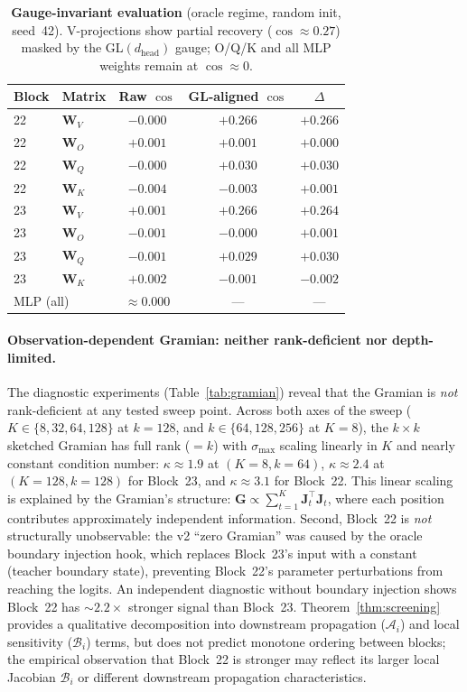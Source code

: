 \documentclass{article}
\newcommand{\bW}{\mathbf{W}}
\newcommand{\bJ}{\mathbf{J}}
\newcommand{\bG}{\mathbf{G}}
\newcommand{\cA}{\mathcal{A}}
\newcommand{\cB}{\mathcal{B}}
\begin{document}
\begin{table}[t]
\centering
\caption{\textbf{Gauge-invariant evaluation} (oracle regime, random init, seed~42).  V-projections show partial recovery ($\cos \approx 0.27$) masked by the GL$(d_\text{head})$ gauge; O/Q/K and all MLP weights remain at $\cos \approx 0$.}
\label{tab:gauge-invariant}
\small
\begin{tabular}{@{}l l cc c@{}}
\toprule
\textbf{Block} & \textbf{Matrix} & \textbf{Raw $\cos$} & \textbf{GL-aligned $\cos$} & \textbf{$\Delta$} \\
\midrule
22 & $\bW_V$ & $-0.000$ & $+0.266$ & $+0.266$ \\
22 & $\bW_O$ & $+0.001$ & $+0.001$ & $+0.000$ \\
22 & $\bW_Q$ & $-0.000$ & $+0.030$ & $+0.030$ \\
22 & $\bW_K$ & $-0.004$ & $-0.003$ & $+0.001$ \\
\midrule
23 & $\bW_V$ & $+0.001$ & $+0.266$ & $+0.264$ \\
23 & $\bW_O$ & $-0.001$ & $-0.000$ & $+0.001$ \\
23 & $\bW_Q$ & $-0.001$ & $+0.029$ & $+0.030$ \\
23 & $\bW_K$ & $+0.002$ & $-0.001$ & $-0.002$ \\
\midrule
\multicolumn{2}{l}{MLP (all)} & $\approx 0.000$ & --- & --- \\
\bottomrule
\end{tabular}
\end{table}

\paragraph{Observation-dependent Gramian: neither rank-deficient nor depth-limited.}
The diagnostic experiments (Table~\ref{tab:gramian}) reveal that the Gramian is \emph{not} rank-deficient at any tested sweep point.  Across both axes of the sweep ($K \in \{8, 32, 64, 128\}$ at $k{=}128$, and $k \in \{64, 128, 256\}$ at $K{=}8$), the $k \times k$ sketched Gramian has full rank ($= k$) with $\sigma_{\max}$ scaling linearly in $K$ and nearly constant condition number: $\kappa \approx 1.9$ at $(K{=}8, k{=}64)$, $\kappa \approx 2.4$ at $(K{=}128, k{=}128)$ for Block~23, and $\kappa \approx 3.1$ for Block~22.  This linear scaling is explained by the Gramian's structure: $\bG \propto \sum_{t=1}^{K} \bJ_t^\top \bJ_t$, where each position contributes approximately independent information.  Second, Block~22 is \emph{not} structurally unobservable: the v2 ``zero Gramian'' was caused by the oracle boundary injection hook, which replaces Block~23's input with a constant (teacher boundary state), preventing Block~22's parameter perturbations from reaching the logits.  An independent diagnostic without boundary injection shows Block~22 has $\sim 2.2\times$ stronger signal than Block~23.  Theorem~\ref{thm:screening} provides a qualitative decomposition into downstream propagation ($\cA_i$) and local sensitivity ($\cB_i$) terms, but does not predict monotone ordering between blocks; the empirical observation that Block~22 is stronger may reflect its larger local Jacobian $\cB_i$ or different downstream propagation characteristics.
\end{document}
